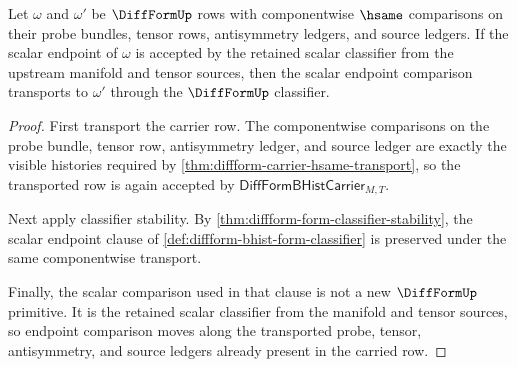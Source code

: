 \begin{theorem}
\label{thm:diffform-scalar-endpoint-transport}
Let $\omega$ and $\omega'$ be $\DiffFormUp$ rows with componentwise $\hsame$
comparisons on their probe bundles, tensor rows, antisymmetry ledgers, and
source ledgers. If the scalar endpoint of $\omega$ is accepted by the retained
scalar classifier from the upstream manifold and tensor sources, then the
scalar endpoint comparison transports to $\omega'$ through the
$\DiffFormUp$ classifier.
\end{theorem}
\begin{proof}
First transport the carrier row. The componentwise comparisons on the probe
bundle, tensor row, antisymmetry ledger, and source ledger are exactly the
visible histories required by
\autoref{thm:diffform-carrier-hsame-transport}, so the transported row is
again accepted by $\mathsf{DiffFormBHistCarrier}_{M,T}$.

Next apply classifier stability. By
\autoref{thm:diffform-form-classifier-stability}, the scalar endpoint clause
of \autoref{def:diffform-bhist-form-classifier} is preserved under the same
componentwise transport.

Finally, the scalar comparison used in that clause is not a new
$\DiffFormUp$ primitive. It is the retained scalar classifier from the
manifold and tensor sources, so endpoint comparison moves along the
transported probe, tensor, antisymmetry, and source ledgers already present in
the carried row.
\end{proof}

